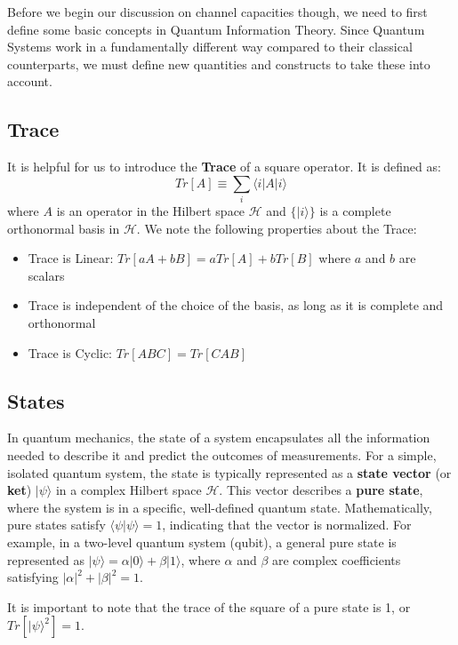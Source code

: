 Before we begin our discussion on channel capacities though, we need to first define some
basic concepts in Quantum Information Theory. Since Quantum Systems work in a fundamentally
different way compared to their classical counterparts, we must define new quantities and
constructs to take these into account.

\subsection{Trace}
It is helpful for us to introduce the \textbf{Trace} of a square operator. It is defined as:
\begin{equation}
    Tr[A] \equiv \displaystyle\sum_{i} \langle i | A | i \rangle
\end{equation}
where $A$ is an operator in the Hilbert space $\mathcal{H}$ and $\{|i\rangle\}$ is a complete
orthonormal basis in $\mathcal{H}$.
We note the following properties about the Trace:
\begin{itemize}
    \item Trace is Linear: $Tr[aA + bB] = aTr[A] + bTr[B]$ where $a$ and $b$ are scalars
    \item Trace is independent of the choice of the basis, as long as it is complete and orthonormal
    \item Trace is Cyclic: $Tr[ABC] = Tr[CAB]$
\end{itemize} 

\subsection{States}

In quantum mechanics, the state of a system encapsulates all the information needed to describe
it and predict the outcomes of measurements. For a simple, isolated quantum system, the state
is typically represented as a \textbf{state vector} (or \textbf{ket}) \( |\psi\rangle \) in a
complex Hilbert space \( \mathcal{H} \). This vector describes a \textbf{pure state}, where the
system is in a specific, well-defined quantum state. Mathematically, pure states satisfy
\( \langle \psi | \psi \rangle = 1 \), indicating that the vector is normalized. For example,
in a two-level quantum system (qubit), a general pure state is represented as
\( |\psi\rangle = \alpha |0\rangle + \beta |1\rangle \), where \( \alpha \) and \( \beta \) are
complex coefficients satisfying \( |\alpha|^2 + |\beta|^2 = 1 \).

It is important to note that the trace of the square of a pure state is 1, or
$Tr[| \psi \rangle^2] = 1$.

